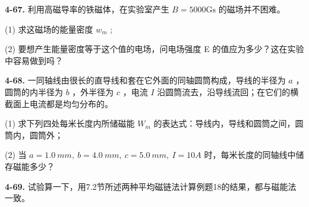 \vfill


\textbf{4-67.} 利用高磁导率的铁磁体，在实验室产生 $B = 5000\mathrm{Gs}$ 的磁场并不困难。

(1) 求这磁场的能量密度 $w_{m}$ ;

(2) 要想产生能量密度等于这个值的电场，问电场强度 E 的值应为多少？这在实验中容易做到吗？

\vfill\newpage

\textbf{4-68.} 一同轴线由很长的直导线和套在它外面的同轴圆筒构成，导线的半径为 $a$ ，圆筒的内半径为 $b$ ，外半径为 $c$ ，电流 $I$ 沿圆筒流去，沿导线流回；在它们的横截面上电流都是均匀分布的。

(1) 求下列四处每米长度内所储磁能 $W_{m}$ 的表达式：导线内，导线和圆筒之间，圆筒内，圆筒外；

(2) 当 $a=1.0\ mm,\ b=4.0\ mm,\ c=5.0\ mm,\ I=10A$ 时，每米长度的同轴线中储存磁能多少？

\vfill


\textbf{4-69.} 试验算一下，用7.2节所述两种平均磁链法计算例题18的结果，都与磁能法一致。

\vfill
\newpage